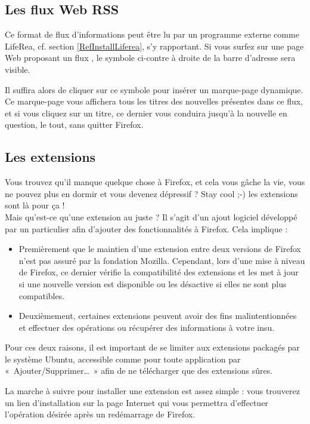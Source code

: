 \subsection{Les flux Web RSS}
Ce format de flux d'informations peut être lu par un programme externe comme LifeRea, cf. section \ref{RefInstallLiferea}, s'y rapportant. Si vous surfez sur une page Web proposant un flux , le symbole ci-contre à droite de la barre d'adresse sera visible.\par
{}
Il suffira alors de cliquer sur ce symbole pour insérer un marque-page dynamique. Ce marque-page vous affichera tous les titres des nouvelles présentes dans ce flux, et si vous cliquez sur un titre, ce dernier vous conduira jusqu'à la nouvelle en question, le tout, sans quitter Firefox.
\subsection{Les extensions}
Vous trouvez qu'il manque quelque chose à Firefox, et cela vous gâche la vie, vous ne pouvez plus en dormir et vous devenez dépressif ? Stay cool ;-) les extensions sont là pour ça !\\
Mais qu'est-ce qu'une extension au juste ? Il s'agit d'un ajout logiciel développé par un particulier afin d'ajouter des fonctionnalités à Firefox. Cela implique :\par
\begin{itemize}
\item Premièrement que le maintien d'une extension entre deux versions de Firefox n'est pas assuré par la fondation Mozilla. Cependant, lors d'une mise à niveau de Firefox, ce dernier vérifie la compatibilité des extensions et les met à jour si une nouvelle version est disponible ou les désactive si elles ne sont plus compatibles.
\item Deuxièmement, certaines extensions peuvent avoir des fins malintentionnées et effectuer des opérations ou récupérer des informations à votre insu.
\end{itemize}
Pour ces deux raisons, il est important de se limiter aux extensions packagés par le système Ubuntu, accessible comme pour toute application par «~Ajouter/Supprimer\dots{}~» afin de ne télécharger que des extensions sûres.\par
La marche à suivre pour installer une extension est assez simple : vous trouverez un lien d'installation sur la page Internet qui vous permettra d'effectuer l'opération désirée après un redémarrage de Firefox.
